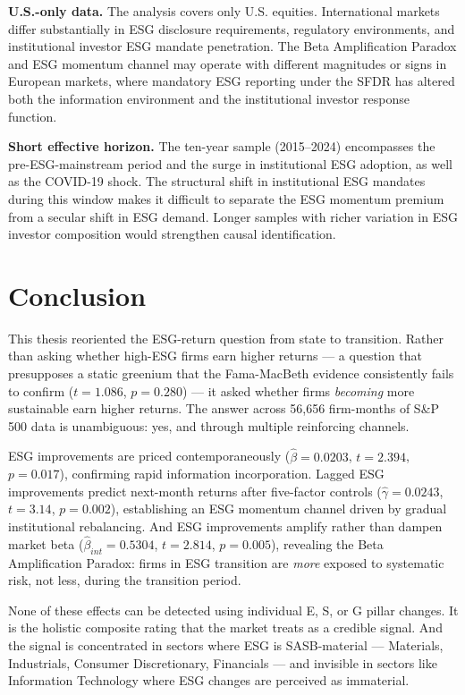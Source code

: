 \textbf{U.S.-only data.} The analysis covers only U.S. equities. International markets differ substantially in ESG disclosure requirements, regulatory environments, and institutional investor ESG mandate penetration. The Beta Amplification Paradox and ESG momentum channel may operate with different magnitudes or signs in European markets, where mandatory ESG reporting under the SFDR has altered both the information environment and the institutional investor response function.

\textbf{Short effective horizon.} The ten-year sample (2015--2024) encompasses the pre-ESG-mainstream period and the surge in institutional ESG adoption, as well as the COVID-19 shock. The structural shift in institutional ESG mandates during this window makes it difficult to separate the ESG momentum premium from a secular shift in ESG demand. Longer samples with richer variation in ESG investor composition would strengthen causal identification.

\section{Conclusion}

This thesis reoriented the ESG-return question from state to transition. Rather than asking whether high-ESG firms earn higher returns --- a question that presupposes a static greenium that the Fama-MacBeth evidence consistently fails to confirm ($t=1.086$, $p=0.280$) --- it asked whether firms \emph{becoming} more sustainable earn higher returns. The answer across 56,656 firm-months of S\&P 500 data is unambiguous: yes, and through multiple reinforcing channels.

ESG improvements are priced contemporaneously ($\hat{\beta}=0.0203$, $t=2.394$, $p=0.017$), confirming rapid information incorporation. Lagged ESG improvements predict next-month returns after five-factor controls ($\hat{\gamma}=0.0243$, $t=3.14$, $p=0.002$), establishing an ESG momentum channel driven by gradual institutional rebalancing. And ESG improvements amplify rather than dampen market beta ($\hat{\beta}_{int}=0.5304$, $t=2.814$, $p=0.005$), revealing the Beta Amplification Paradox: firms in ESG transition are \emph{more} exposed to systematic risk, not less, during the transition period.

None of these effects can be detected using individual E, S, or G pillar changes. It is the holistic composite rating that the market treats as a credible signal. And the signal is concentrated in sectors where ESG is SASB-material --- Materials, Industrials, Consumer Discretionary, Financials --- and invisible in sectors like Information Technology where ESG changes are perceived as immaterial.

